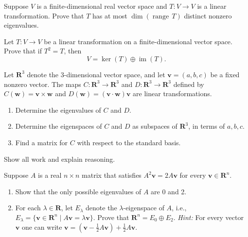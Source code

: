 \documentclass[11pt,twoside,openany]{memoir}
\begin{document}
        \begin{exercise}
        Suppose $V$ is a finite-dimensional real vector space and $T: V \to V$ is a linear transformation. Prove that $T$ has at most $\dim(\operatorname{range} \, T)$ distinct nonzero eigenvalues.
        \end{exercise}
        
        \begin{exercise}
        Let $T: V \to V$ be a linear transformation on a finite-dimensional vector space. Prove that if $T^2 = T$, then
        \[
        V = \ker(T) \oplus \operatorname{im}(T).
        \]
        \end{exercise}
        
        \begin{exercise}
        Let $\mathbf{R}^3$ denote the $3$-dimensional vector space, and let $\mathbf{v}=(a,b,c)$ be a fixed nonzero vector. The maps $C: \mathbf{R}^3 \to \mathbf{R}^3$ and $D: \mathbf{R}^3 \to \mathbf{R}^3$ defined by $C(\mathbf{w}) = \mathbf{v} \times \mathbf{w}$ and $D(\mathbf{w}) = (\mathbf{v} \cdot \mathbf{w}) \mathbf{v}$ are linear transformations.
        \begin{enumerate}[label = (\arabic*)]
            \item Determine the eigenvalues of $C$ and $D$.
            \item Determine the eigenspaces of $C$ and $D$ as subspaces of $\mathbf{R}^3$, in terms of $a, b, c$.
            \item Find a matrix for $C$ with respect to the standard basis.
        \end{enumerate}
        Show all work and explain reasoning.
        \end{exercise}
        
        \begin{exercise}
        Suppose $A$ is a real $n \times n$ matrix that satisfies $A^2 \mathbf{v} = 2 A \mathbf{v}$ for every $\mathbf{v} \in \mathbf{R}^n$.
        \begin{enumerate}[label = (\arabic*)]
            \item Show that the only possible eigenvalues of $A$ are 0 and 2.
            \item For each $\lambda \in \mathbf{R}$, let $E_\lambda$ denote the $\lambda$-eigenspace of $A$, i.e., $E_\lambda = \{ \mathbf{v} \in \mathbf{R}^n \mid A \mathbf{v} = \lambda \mathbf{v} \}$. Prove that $\mathbf{R}^n = E_0 \oplus E_2$. \textit{Hint:} For every vector $\mathbf{v}$ one can write $\mathbf{v} = (\mathbf{v} - \frac{1}{2} A \mathbf{v}) + \frac{1}{2} A \mathbf{v}$.
        \end{enumerate}
        \end{exercise}
        
\end{document}
